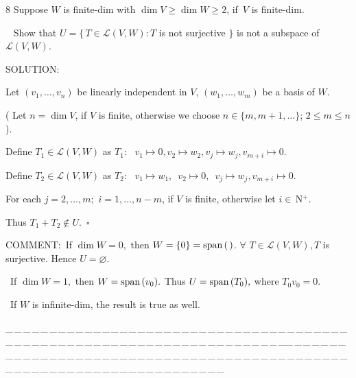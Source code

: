 \documentclass[a4paper, 11pt, UTF8]{article}
\def\Spn{\textup{span}\,}
\def\Lm{\mathcal{L}}
\def\Nbp{$\,{\timesbf N}$^+}
\begin{document}
\begin{large}
{\timesbf\Large 8} {\timessl\Large 
Suppose $W$ is finite-dim with $\dim V\geq\dim W\geq 2$, if \,$V$ is finite-dim.}\par\,\,\,
{\timessl\Large Show that $U=\{\,T\in\Lm(V, W):T$ is not surjective $\}$ is not a subspace of $\Lm(V, W)$.
}\par
{\timesbf S\footnotesize{OLUTION:}}\par\quad
Let $(v_1,\dots,v_n)$ be linearly independent in $V$, $(w_1,\dots,w_m)$ be a basis of $W$.\par\quad
( Let $n=\dim V$, if $V$ is finite, otherwise we choose $n\in\{m,m+1,\dots\}$; $2\leq m\leq n$ ).\par\quad
Define $T_1\in\Lm(V,W)$ as $T_1:\,\,\,\,v_1\mapsto 0,$\qquad$v_2\mapsto w_2,$\qquad$v_j\mapsto w_j,$\qquad$v_{m+i}\mapsto 0.$\par\quad
Define $T_2\in\Lm(V,W)$ as $T_2:\,\,\,\,v_1\mapsto w_1,$\,\,\,\quad$v_2\mapsto 0,$\,\,\,\qquad$v_j\mapsto w_j,$\qquad$v_{m+i}\mapsto 0.$\par\quad
For each $j=2,\dots,m;\,\,i=1,\dots,n-m$, if $V$ is finite, otherwise let $i\in\Nbp.$\par\quad
Thus $T_1+T_2\not\in U.\,\,\,\square$\par
{\timesbf C\small{OMMENT:}}\,\,\,If $\dim W=0,$ then $W=\{0\}=\Spn(\,)$. $\forall\,\,T\in\Lm(V,W), T$ is surjective. Hence $U=\varnothing.$\par\qquad\qquad\quad\, If $\dim W=1,$ then $W=\Spn(v_0).$ Thus $U=\Spn(T_0),$ where $T_0 v_0=0.$\par\qquad\qquad\quad\, If $W$ is infinite-dim, the result is true as well.\par
{\tiny \_\,\_\,\_\,\_\,\_\,\_\,\_\,\_\,\_\,\_\,\_\,\_\,\_\,\_\,\_\,\_\,\_\,\_\,\_\,\_\,\_\,\_\,\_\,\_\,\_\,\_\,\_\,\_\,\_\,\_\,\_\,\_\,\_\,\_\,\_\,\_\,\_\,\_\,\_\,\_\,\_\,\_\,\_\,\_\,\_\,\_\,\_\,\_\,\_\,\_\,\_\,\_\,\_\,\_\,\_\,\_\,\_\,\_\,\_\,\_\,\_\,\_\,\_\,\_\,\_\,\_\,\_\,\_\,\_\,\_\,\_\_\,\_\,\_\,\_\,\_\,\_\,\_\,\_\,\_\,\_\,\_\,\_\,\_\,\_\,\_\,\_\,\_\,\_\,\_\,\_\,\_\,\_\,\_\,\_\,\_\,\_\,\_\,\_\,\_\,\_\,\_\,\_\,\_\,\_\,\_\,\_\,\_\,\_\,\_\,\_\,\_\,\_\,\_\,\_\,\_\,\_\,\_\,\_\,\_\,\_\,\_\,\_\,\_\,\_\,\_\,\_\,\_\,\_\,\_\,\_\,\_\,\_\,\_\,\_\,\_\,\_\,\_\,\_\,\_\,\_\,\_}\par


\end{large}
\end{document}
